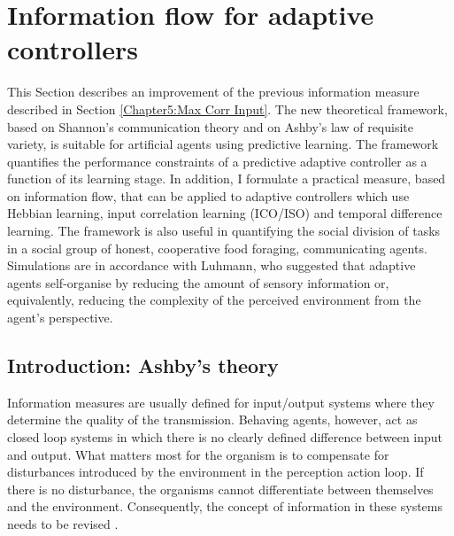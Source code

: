\section{Information flow for adaptive controllers \label{Chapter6:Information Flow}}

This Section describes an improvement of the previous information measure described
in Section \ref{Chapter5:Max Corr Input}.
The new theoretical framework, based on Shannon's communication theory
 and on Ashby's law of requisite variety, is suitable for artificial agents
using predictive learning.
The framework quantifies the performance constraints of a predictive adaptive
controller as a function of its learning stage.
In addition, I formulate a practical measure, based on information flow,
that can be applied to adaptive controllers which use Hebbian learning,
input correlation learning (ICO/ISO) and temporal difference learning.
The framework is also useful in quantifying the social division of tasks in a
social group of honest, cooperative food foraging, communicating agents.
Simulations are in accordance with Luhmann, who
suggested that adaptive agents self-organise by reducing the amount of sensory
information or, equivalently, reducing the complexity of the
perceived environment from the agent’s perspective.

\subsection{Introduction: Ashby's theory}

Information measures are usually defined for input/output systems where
they determine the quality of the transmission. Behaving agents,
however, act as closed loop systems in which there is no clearly defined
difference between input and output.
What matters most for the organism is to compensate for disturbances introduced by
 the environment in the perception action loop. If there is no disturbance,
the organisms cannot differentiate between themselves and the environment.
Consequently, the concept of information in these
systems needs to be revised \citep{RadicalConstruct}.

